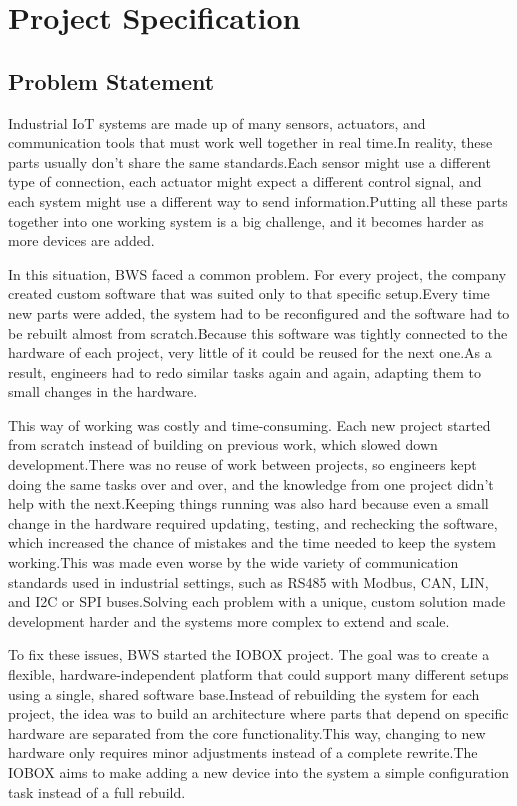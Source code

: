 \section{Project Specification}

\subsection{Problem Statement}
Industrial IoT systems are made up of many sensors, actuators, and communication tools that must work well together in real time.In reality, these parts usually don't share the same standards.Each sensor might use a different type of connection, each actuator might expect a different control signal, and each system might use a different way to send information.Putting all these parts together into one working system is a big challenge, and it becomes harder as more devices are added.

In this situation, BWS faced a common problem.
For every project, the company created custom software that was suited only to that specific setup.Every time new parts were added, the system had to be reconfigured and the software had to be rebuilt almost from scratch.Because this software was tightly connected to the hardware of each project, very little of it could be reused for the next one.As a result, engineers had to redo similar tasks again and again, adapting them to small changes in the hardware.

This way of working was costly and time-consuming.
Each new project started from scratch instead of building on previous work, which slowed down development.There was no reuse of work between projects, so engineers kept doing the same tasks over and over, and the knowledge from one project didn't help with the next.Keeping things running was also hard because even a small change in the hardware required updating, testing, and rechecking the software, which increased the chance of mistakes and the time needed to keep the system working.This was made even worse by the wide variety of communication standards used in industrial settings, such as RS485 with Modbus, CAN, LIN, and I2C or SPI buses.Solving each problem with a unique, custom solution made development harder and the systems more complex to extend and scale.

To fix these issues, BWS started the IOBOX project.
The goal was to create a flexible, hardware-independent platform that could support many different setups using a single, shared software base.Instead of rebuilding the system for each project, the idea was to build an architecture where parts that depend on specific hardware are separated from the core functionality.This way, changing to new hardware only requires minor adjustments instead of a complete rewrite.The IOBOX aims to make adding a new device into the system a simple configuration task instead of a full rebuild.


